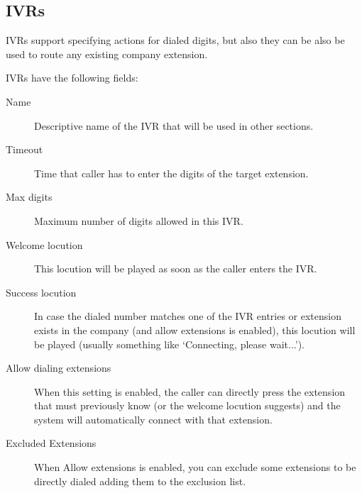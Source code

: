 \documentclass[letterpaper,10pt,english]{sphinxmanual}
\begin{document}
\subsection{IVRs}
\label{company/ivrs:ivrs}
IVRs support specifying actions for dialed digits, but also they can be also be used
to route any existing company extension.

IVRs have the following fields:
\begin{description}
\item[{Name}] \leavevmode{}\label{company/ivrs:term-name}
Descriptive name of the IVR that will be used in other sections.

\item[{Timeout}] \leavevmode{}\label{company/ivrs:term-timeout}
Time that caller has to enter the digits of the target extension.

\item[{Max digits}] \leavevmode{}\label{company/ivrs:term-max-digits}
Maximum number of digits allowed in this IVR.

\item[{Welcome locution}] \leavevmode{}\label{company/ivrs:term-welcome-locution}
This locution will be played as soon as the caller enters the IVR.

\item[{Success locution}] \leavevmode{}\label{company/ivrs:term-success-locution}
In case the dialed number matches one of the IVR entries or extension
exists in the company (and allow extensions is enabled), this locution
will be played (usually something like `Connecting, please wait...').

\item[{Allow dialing extensions}] \leavevmode{}\label{company/ivrs:term-allow-dialing-extensions}
When this setting is enabled, the caller can directly press the extension
that must previously know (or the welcome locution suggests) and the system
will automatically connect with that extension.

\item[{Excluded Extensions}] \leavevmode{}\label{company/ivrs:term-excluded-extensions}
When Allow extensions is enabled, you can exclude some extensions to be
directly dialed adding them to the exclusion list.


\end{description}
\end{document}
